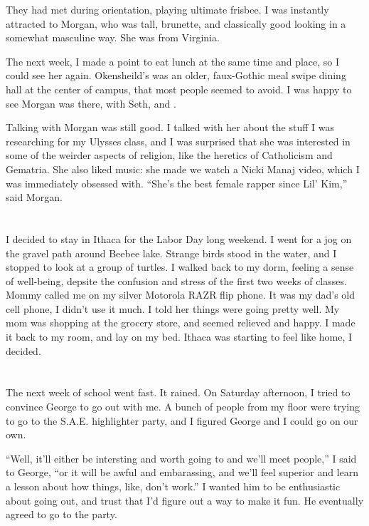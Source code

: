 They had met during orientation, playing ultimate frisbee.  I was instantly
attracted to Morgan, who was tall, brunette, and classically good looking in a
somewhat masculine way.  She was from Virginia. 

The next week, I made a point to eat lunch at the same time and place, so I
could see her again.  Okensheild's was an older, faux-Gothic meal swipe dining
hall at the center of campus, that most people seemed to avoid.   I was happy to
see Morgan was there, with Seth, and .

Talking with Morgan was still good.  I talked with her about the stuff I was
researching for my Ulysses class, and I was surprised that she was interested in
some of the weirder aspects of religion, like the heretics of Catholicism and
Gematria.  She also liked music: she made we watch a Nicki Manaj video, which I
was immediately obsessed with.  ``She's the best female rapper since Lil' Kim,''
said Morgan.

\section{}

I decided to stay in Ithaca for the Labor Day long weekend.  I went for a jog on
the gravel path around Beebee lake.  Strange birds stood in the water, and I
stopped to look at a group of turtles.  I walked back to my dorm, feeling a
sense of well-being, depsite the confusion and stress of the first two weeks of
classes.  Mommy called me on my silver Motorola RAZR flip phone.  It was my
dad's old cell phone, I didn't use it much.  I told her things were going pretty
well.  My mom was shopping at the grocery store, and seemed relieved and happy.
I made it back to my room, and lay on my bed.  Ithaca was starting to feel like
home, I decided.  

\section{}

The next week of school went fast.  It rained.  On Saturday afternoon, I tried
to convince George to go out with me.  A bunch of people from my floor were
trying to go to the S.A.E. highlighter party, and I figured George and I could
go on our own.

``Well, it'll either be intersting and worth going to and we'll meet people,'' I
said to George, ``or it will be awful and embarassing, and we'll feel superior
and learn a lesson about how things, like, don't work.''  I wanted him to be
enthusiastic about going out, and trust that I'd figure out a way to make it
fun.  He eventually agreed to go to the party.  

